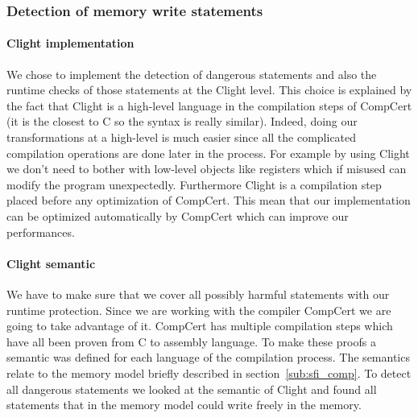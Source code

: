 \documentclass[11pt]{sdm}
\begin{document}
\subsubsection{Detection of memory write statements}
\label{ssub:Detection of memory write statements}

\paragraph{Clight implementation}
\label{par:Clight implementation}

We chose to implement the detection of dangerous statements and also the runtime checks of those statements at the Clight level.
This choice is explained by the fact that Clight is a high-level language in the compilation steps of CompCert (it is the closest to C so the syntax is really similar).
Indeed, doing our transformations at a high-level is much easier since all the complicated compilation operations are done later in the process.
For example by using Clight we don't need to bother with low-level objects like registers which if misused can modify the program unexpectedly.
Furthermore Clight is a compilation step placed before any optimization of CompCert.
This mean that our implementation can be optimized automatically by CompCert which can improve our performances.

\paragraph{Clight semantic}
\label{par:Clight semantic}

We have to make sure that we cover all possibly harmful statements with our runtime protection.
Since we are working with the compiler CompCert we are going to take advantage of it.
CompCert has multiple compilation steps which have all been proven from C to assembly language.
To make these proofs a semantic was defined for each language of the compilation process. The semantics relate to the memory model briefly described in section~\ref{sub:sfi_comp}.
To detect all dangerous statements we looked at the semantic of Clight and found all statements that in the memory model could write freely in the memory.\\
\end{document}
